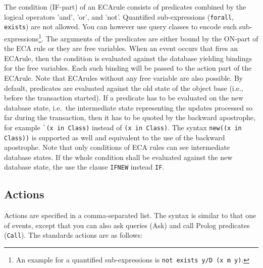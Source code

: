 The condition (IF-part) of an ECArule consists of predicates 
combined by the logical operators 'and', 'or',
and 'not'. Quantified sub-expressions ({\tt forall}, {\tt exists}) are not allowed.
You can however use query classes to encode such sub-expressions\footnote{%
An example for a quantified sub-expressions is {\tt not exists y/D (x m y)}.}.
The arguments of the predicates are either bound by the ON-part
of the ECA rule or they are free variables. When an event occurs that fires an
ECArule, then the condition is evaluated against the database yielding bindings for the
free variables. Each such binding will be passed to the action part of the ECArule. 
Note that ECArules without any free variable are also possible.
By default, predicates are evaluated against the old state of the object base
(i.e., before the transaction started).
If a predicate has to be evaluated on the new database state, i.e.\ the intermediate state
representing the updates processed so far during the transaction, then it has
to be quoted by the backward apostrophe, for example  \verb+`(x in Class)+
instead of \verb+(x in Class)+. The syntax \verb+new((x in Class))+
is supported as well and equivalent to the use of the backward apostrophe.
Note that only conditions of ECA rules can see intermediate database states.
If the whole condition shall be evaluated against the new database state, the
use the clause {\tt IFNEW} instead {\tt IF}. 

\subsection{Actions}

Actions are specified in a comma-separated list. The syntax is similar
to that one of events, except that you can also ask queries (Ask)
and call Prolog predicates ({\tt Call}). The standards actions are as follows:

